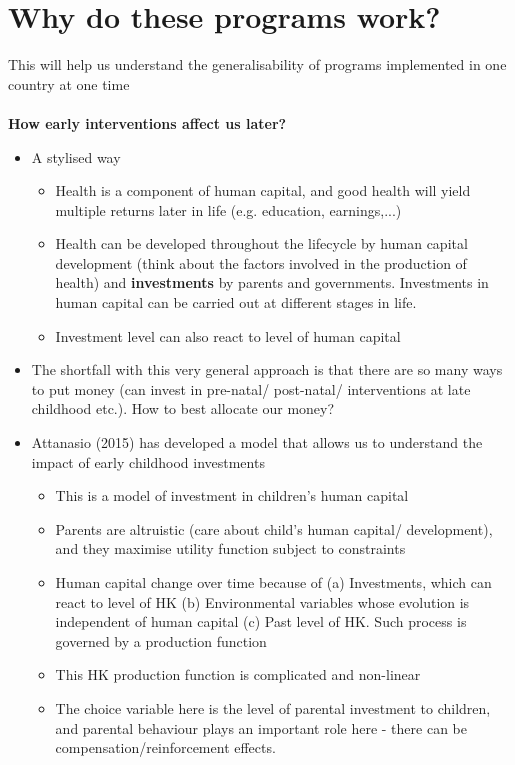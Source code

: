 \section{Why do these programs work?}
This will help us understand the generalisability of programs implemented in one country at one time\\ \\
\textbf{How early interventions affect us later?}
\begin{itemize}
\item A stylised way
\begin{itemize}
    \item Health is a component of human capital, and good health will yield multiple returns later in life (e.g. education, earnings,...)
    \item Health can be developed throughout the lifecycle by human capital development (think about the factors involved in the production of health) and \textbf {\large{investments}} by parents and governments. Investments in human capital can be carried out at different stages in life.
    \item Investment level can also react to level of human capital
\end{itemize}
\item The shortfall with this very general approach is that there are so many ways to put money (can invest in pre-natal/ post-natal/ interventions at late childhood etc.). How to best allocate our money? 
\item Attanasio (2015) has developed a model that allows us to understand the impact of early childhood investments
\begin{itemize}
    \item This is a model of investment in children's human capital
    \item Parents are altruistic (care about child's human capital/ development), and they maximise utility function subject to constraints
    \item Human capital change over time because of (a) Investments, which can react to level of HK (b) Environmental variables whose evolution is independent of human capital (c) Past level of HK. Such process is governed by a production function
    \item This HK production function is complicated and non-linear
    \item The choice variable here is the level of parental investment to children, and parental behaviour plays an important role here - there can be compensation/reinforcement effects.

\end{itemize}
\end{itemize}
